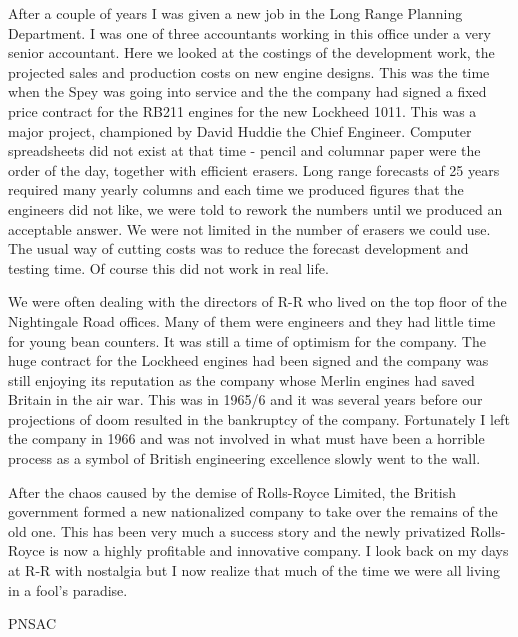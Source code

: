 After a couple of years I was given a new job in the Long Range
Planning Department. I was one of three accountants working in this
office under a very senior accountant. Here we looked at the costings
of the development work, the projected sales  and production costs on
new engine designs. This was the time when the Spey was going into
service and the the company had signed a fixed price contract for the
RB211 engines for the new Lockheed 1011. This was a major project,
championed by David Huddie the Chief Engineer. Computer spreadsheets
did not exist at that time - pencil and columnar paper were the order
of the day, together with efficient erasers. Long range forecasts of
25 years required many yearly columns and each time we produced
figures that the engineers did not like, we were told to rework the
numbers until we produced an acceptable answer. We were not limited in
the number of erasers we could use. The usual way of cutting costs was
to reduce the forecast development and testing time. Of course this
did not work in real life.

We were often dealing with the directors of R-R who lived on the top
floor of the Nightingale Road offices. Many of them were engineers and
they had little time for young bean counters. It was still a time of
optimism for the company. The huge contract for the Lockheed engines
had been signed and the company was still enjoying its reputation as
the company whose Merlin engines had saved Britain in the air
war. This was in 1965/6 and it was several years before our
projections of doom resulted in the bankruptcy of the
company. Fortunately I left the company in 1966 and was not involved
in what must have been a horrible process as a symbol of British
engineering excellence slowly went to the wall. 

After the chaos caused by the demise of Rolls-Royce Limited, the
British government formed a new nationalized company to take over the
remains of the old one. This has been very much a success story and
the newly privatized Rolls-Royce is now a highly profitable and
innovative company. I look back on my days at R-R with nostalgia but I
now realize that much of the time we were all living in a fool's
paradise.


\begin{footnotesize}
    \raggedleft PNSAC\\
\end{footnotesize}



